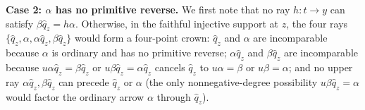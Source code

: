 \medskip
\noindent\textbf{Case 2: $\alpha$ has no primitive reverse.}
We first note that no ray $h\colon t\to y$ can satisfy $\beta\widehat q_z=h\alpha$. Otherwise, in the faithful injective support at $z$, the four rays $\{\widehat q_z,\alpha,\alpha\widehat q_z,\beta\widehat q_z\}$ would form a four-point crown: $\widehat q_z$ and $\alpha$ are incomparable because $\alpha$ is ordinary and has no primitive reverse; $\alpha\widehat q_z$ and $\beta\widehat q_z$ are incomparable because $u\alpha\widehat q_z=\beta\widehat q_z$ or $u\beta\widehat q_z=\alpha\widehat q_z$ cancels $\widehat q_z$ to $u\alpha=\beta$ or $u\beta=\alpha$; and no upper ray $\alpha\widehat q_z,\beta\widehat q_z$ can precede $\widehat q_z$ or $\alpha$ (the only nonnegative-degree possibility $u\beta\widehat q_z=\alpha$ would factor the ordinary arrow $\alpha$ through $\widehat q_z$).

